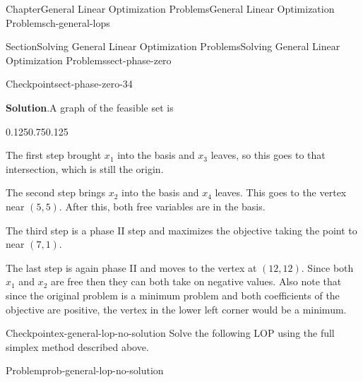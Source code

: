 \documentclass[oneside,10pt,]{book}
\newcommand{\blocktitlefont}{\relax}
\numberwithin{equation}{section}
\begin{document}
\begin{chapterptx}{Chapter}{General Linear Optimization Problems}{}{General Linear Optimization Problems}{}{}{ch-general-lops}
\begin{sectionptx}{Section}{Solving General Linear Optimization Problems}{}{Solving General Linear Optimization Problems}{}{}{sect-phase-zero}
\begin{inlineexercise}{Checkpoint}{}{sect-phase-zero-34}
\par\smallskip%
\noindent\textbf{\blocktitlefont Solution}.\hypertarget{sect-phase-zero-34-2}{}\quad{}A graph of the feasible set is%
\begin{image}{0.125}{0.75}{0.125}{}%
%
\end{image}%
The first step brought \(x_1\) into the basis and \(x_3\) leaves, so this goes to that intersection, which is still the origin.%
\par
The second step brings \(x_2\) into the basis and \(x_4\) leaves. This goes to the vertex near \((5,5)\). After this, both free variables are in the basis.%
\par
The third step is a phase II step and maximizes the objective taking the point to near \((7,1)\).%
\par
The last step is again phase II and moves to the vertex at \((12,12)\). Since both \(x_1\) and \(x_2\) are free then they can both take on negative values. Also note that since the original problem is a minimum problem and both coefficients of the objective are positive, the vertex in the lower left corner would be a minimum.%
\end{inlineexercise}%
\begin{inlineexercise}{Checkpoint}{}{ex-general-lop-no-solution}%
Solve the following LOP using the full simplex method described above.%
\begin{problem}{Problem}{}{prob-general-lop-no-solution}%
%
\begin{equation*}

\end{equation*}
\end{problem}
\end{inlineexercise}
\end{sectionptx}
\end{chapterptx}
\end{document}
